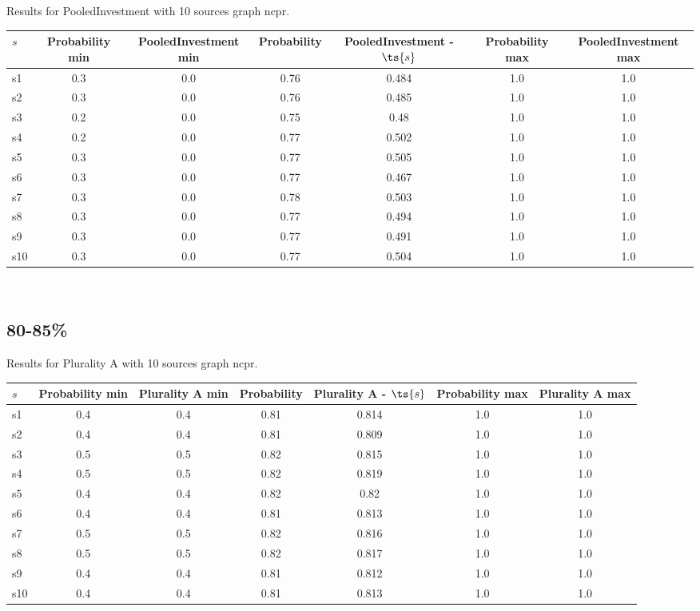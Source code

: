 \documentclass{article}
\begin{document}
\noindent Results for PooledInvestment with 10 sources graph ncpr.

\noindent\begin{tabular}{|l|c|c|c|c|c|c|}
\hline
$s$& Probability min & PooledInvestment min & Probability & PooledInvestment - $\ts{s}$ & Probability max & PooledInvestment max\\
\hline
s1 &0.3 & 0.0 & 0.76 & 0.484 & 1.0 & 1.0\\
\hline
s2 &0.3 & 0.0 & 0.76 & 0.485 & 1.0 & 1.0\\
\hline
s3 &0.2 & 0.0 & 0.75 & 0.48 & 1.0 & 1.0\\
\hline
s4 &0.2 & 0.0 & 0.77 & 0.502 & 1.0 & 1.0\\
\hline
s5 &0.3 & 0.0 & 0.77 & 0.505 & 1.0 & 1.0\\
\hline
s6 &0.3 & 0.0 & 0.77 & 0.467 & 1.0 & 1.0\\
\hline
s7 &0.3 & 0.0 & 0.78 & 0.503 & 1.0 & 1.0\\
\hline
s8 &0.3 & 0.0 & 0.77 & 0.494 & 1.0 & 1.0\\
\hline
s9 &0.3 & 0.0 & 0.77 & 0.491 & 1.0 & 1.0\\
\hline
s10 &0.3 & 0.0 & 0.77 & 0.504 & 1.0 & 1.0\\
\hline
\end{tabular}\\

\newpage

\subsection{80-85\%}

\noindent Results for Plurality A with 10 sources graph ncpr.

\noindent\begin{tabular}{|l|c|c|c|c|c|c|}
\hline
$s$& Probability min & Plurality A min & Probability & Plurality A - $\ts{s}$ & Probability max & Plurality A max\\
\hline
s1 &0.4 & 0.4 & 0.81 & 0.814 & 1.0 & 1.0\\
\hline
s2 &0.4 & 0.4 & 0.81 & 0.809 & 1.0 & 1.0\\
\hline
s3 &0.5 & 0.5 & 0.82 & 0.815 & 1.0 & 1.0\\
\hline
s4 &0.5 & 0.5 & 0.82 & 0.819 & 1.0 & 1.0\\
\hline
s5 &0.4 & 0.4 & 0.82 & 0.82 & 1.0 & 1.0\\
\hline
s6 &0.4 & 0.4 & 0.81 & 0.813 & 1.0 & 1.0\\
\hline
s7 &0.5 & 0.5 & 0.82 & 0.816 & 1.0 & 1.0\\
\hline
s8 &0.5 & 0.5 & 0.82 & 0.817 & 1.0 & 1.0\\
\hline
s9 &0.4 & 0.4 & 0.81 & 0.812 & 1.0 & 1.0\\
\hline
s10 &0.4 & 0.4 & 0.81 & 0.813 & 1.0 & 1.0\\
\hline
\end{tabular}\\
\end{document}
